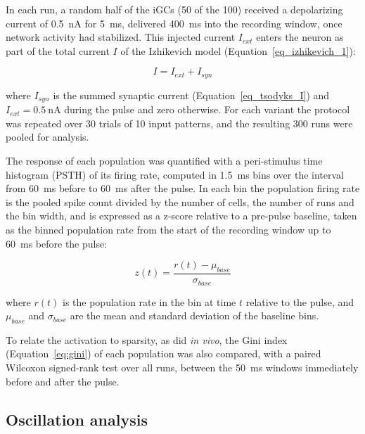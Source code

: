 \documentclass[pdflatex,sn-basic]{sn-jnl}%
\theoremstyle{thmstyleone}%
\theoremstyle{thmstyletwo}%
\theoremstyle{thmstylethree}%
\begin{document}
In each run, a random half of the iGCs (50 of the 100) received a depolarizing current of \SI{0.5}{\nano\ampere} for
\SI{5}{\milli\second}, delivered \SI{400}{\milli\second} into the recording window, once network activity had stabilized. This
injected current $I_{ext}$ enters the neuron as part of the total current $I$ of the Izhikevich model (Equation~\ref{eq_izhikevich_1}):

\begin{equation}
    \label{eq:i_ext}
    I = I_{ext} + I_{syn}
\end{equation}

where $I_{syn}$ is the summed synaptic current (Equation~\ref{eq_tsodyks_I}) and $I_{ext} = \SI{0.5}{\nano\ampere}$ during the pulse
and zero otherwise. For each variant the protocol was repeated over 30 trials of 10 input patterns, and the resulting 300 runs
were pooled for analysis.

The response of each population was quantified with a peri-stimulus time histogram (PSTH) of its firing rate, computed in
\SI{1.5}{\milli\second} bins over the interval from \SI{60}{\milli\second} before to \SI{60}{\milli\second} after the pulse. In
each bin the population firing rate is the pooled spike count divided by the number of cells, the number of runs and the bin
width, and is expressed as a z-score relative to a pre-pulse baseline, taken as the binned population rate from the start of the
recording window up to \SI{60}{\milli\second} before the pulse:

\begin{equation}
    \label{eq:psth_z}
    z(t) = \frac{r(t) - \mu_{base}}{\sigma_{base}}
\end{equation}

where $r(t)$ is the population rate in the bin at time $t$ relative to the pulse, and $\mu_{base}$ and $\sigma_{base}$ are the
mean and standard deviation of the baseline bins.

To relate the activation to sparsity, as \citet{mchughAdultborn2022} did \textit{in vivo}, the Gini index (Equation~\ref{eq:gini})
of each population was also compared, with a paired Wilcoxon signed-rank test over all runs, between the \SI{50}{\milli\second}
windows immediately before and after the pulse.

\subsection{Oscillation analysis}\label{sec:oscillation_analysis}
\end{document}
